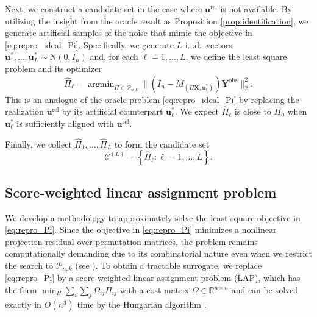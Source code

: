 \documentclass[11pt, reqno]{amsart}
\newcommand{\R}{\mathbb{R}}
\renewcommand{\hat}{\widehat}
\newcommand{\mP}{\mathcal{P}}
\newcommand{\1}{\mbox{1}\hspace{-0.25em}\mbox{l}}
\newcommand{\obs}{\mathrm{obs}}
\newcommand{\rel}{\mathrm{rel}}
\DeclareMathOperator*{\argmin}{argmin}
\newcommand{\Normal}{\mathrm{N}}
\theoremstyle{definition}\newtheorem{problem}{Problem}[section]
\theoremstyle{definition}\newtheorem{definition}[problem]{Definition}
\theoremstyle{remark}\newtheorem{assumption}{Assumption}
\theoremstyle{remark}\newtheorem{remark}[problem]{Remark}
\theoremstyle{definition}\newtheorem{example}[problem]{Example}
\theoremstyle{plain}\newtheorem{theorem}[problem]{Theorem}
\theoremstyle{plain}\newtheorem{question}[problem]{Question}
\theoremstyle{plain}\newtheorem{lemma}[problem]{Lemma}
\theoremstyle{plain}\newtheorem{proposition}[problem]{Proposition}
\theoremstyle{plain}\newtheorem{corollary}[problem]{Corollary}
\theoremstyle{plain}\newtheorem{conjecture}[problem]{Conjecture}
\begin{document}
Next, we construct a candidate set in the case where $\bm{u}^{\rel}$ is not available.
By utilizing the insight from the oracle result as Proposition \ref{prop:identification}, we generate artificial samples of the noise that mimic the objective in \eqref{eq:repro_ideal_Pi}. Specifically, we generate $L$ i.i.d.\ vectors $\bm{u}_1^*, \ldots, \bm{u}_L^* \sim \Normal(0, I_n)$ 
and, for each $\ell=1,\ldots,L$, we define the least square problem and its optimizer
\begin{equation}\label{eq:repro_Pi}
   \hat{\Pi}_{\ell} = \argmin_{\Pi \in \mP_{n,k}}\| (I_n - M_{(\Pi \bm{X}, \bm{u}_{\ell}^*)}) \bm{Y}^{\obs}\|_2^2.
\end{equation}
This is an analogue of the oracle problem \eqref{eq:repro_ideal_Pi} by replacing the realization $\bm{u}^{\rel}$ by its artificial counterpart $\bm{u}^*_\ell$. We expect $\hat{\Pi}_{\ell}$ is close to $\Pi_0$ when $\bm{u}_{\ell}^*$ is sufficiently aligned with $\bm{u}^{\rel}$.

Finally, we collect $\hat{\Pi}_{1},\ldots,\hat{\Pi}_{L}$ to form the candidate set
\begin{equation}\label{eq:permutation candidates set}
    \mathcal{C}^{(L)}=\left\{\hat{\Pi}_{\ell}: \ell =1, \ldots, L\right\}.
\end{equation}


\subsection{Score-weighted linear assignment problem} \label{sec:algorithm}


We develop a methodology to approximately solve the least square objective in \eqref{eq:repro_Pi}.
Since the objective in \eqref{eq:repro_Pi} minimizes a nonlinear projection residual over permutation matrices,  the problem remains computationally demanding due to its combinatorial nature even when we restrict the search to $\mP_{n,k}$ (see \cite{pananjady2016linear,pananjady2017linear}).
To obtain a tractable surrogate, we replace \eqref{eq:repro_Pi} by a score-weighted linear assignment problem (LAP), which has the form $\min_{\Pi} \sum_{i} \sum_j \Omega_{ij} \Pi_{ij}$ with a cost matrix $\Omega \in \R^{n \times n}$ and can be solved exactly in $O(n^3)$ time by the Hungarian algorithm \citep{kuhn1955hungarian}. 
\end{document}
